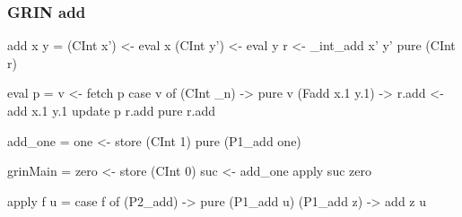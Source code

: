 \documentclass[bigger,aspectratio=169]{beamer}
\begin{document}
\begin{frame}[fragile]
\frametitle{GRIN add}

\begin{center}
	
	\vspace{0.4cm}
	\begin{minipage}{0.45\textwidth}
		\begin{haskellcode}
			add x y =
			 (CInt x') <- eval x
			 (CInt y') <- eval y
			 r <- _int_add x' y'
			 pure (CInt r)
		\end{haskellcode}
		\pause
		\begin{haskellcode}
			eval p =
			 v <- fetch p
			 case v of
			  (CInt _n) -> pure v
			  (Fadd x.1 y.1) ->
			   r.add <- add x.1 y.1
			   update p r.add
			   pure r.add
		\end{haskellcode}
	\end{minipage}
	\hfill
	\pause
	\begin{minipage}{0.50\textwidth}
		\begin{haskellcode}
			add_one =
			 one <- store (CInt 1)
			 pure (P1_add one)
		\end{haskellcode}
		\pause
		\begin{haskellcode}
			grinMain =
			 zero <- store (CInt 0)
			 suc <- add_one
			 apply suc zero
		\end{haskellcode}
		\vfill
		\pause
		\begin{haskellcode}
			apply f u =
			 case f of
			  (P2_add) ->
			   pure (P1_add u)
			  (P1_add z) -> add z u
		\end{haskellcode}
	\end{minipage}

\end{center}
\end{frame}
\end{document}
